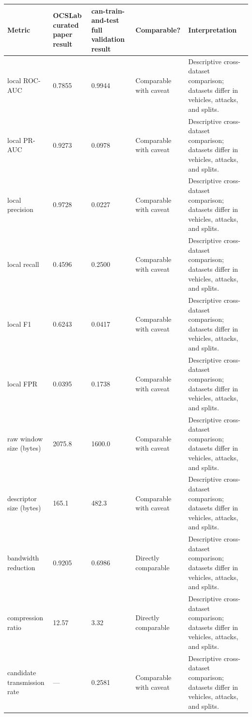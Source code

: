 \begin{tabular}{lllll}
\toprule
Metric & OCSLab curated paper result & can-train-and-test full validation result & Comparable? & Interpretation \\
\midrule
local ROC-AUC & 0.7855 & 0.9944 & Comparable with caveat & Descriptive cross-dataset comparison; datasets differ in vehicles, attacks, and splits. \\
local PR-AUC & 0.9273 & 0.0978 & Comparable with caveat & Descriptive cross-dataset comparison; datasets differ in vehicles, attacks, and splits. \\
local precision & 0.9728 & 0.0227 & Comparable with caveat & Descriptive cross-dataset comparison; datasets differ in vehicles, attacks, and splits. \\
local recall & 0.4596 & 0.2500 & Comparable with caveat & Descriptive cross-dataset comparison; datasets differ in vehicles, attacks, and splits. \\
local F1 & 0.6243 & 0.0417 & Comparable with caveat & Descriptive cross-dataset comparison; datasets differ in vehicles, attacks, and splits. \\
local FPR & 0.0395 & 0.1738 & Comparable with caveat & Descriptive cross-dataset comparison; datasets differ in vehicles, attacks, and splits. \\
raw window size (bytes) & 2075.8 & 1600.0 & Comparable with caveat & Descriptive cross-dataset comparison; datasets differ in vehicles, attacks, and splits. \\
descriptor size (bytes) & 165.1 & 482.3 & Comparable with caveat & Descriptive cross-dataset comparison; datasets differ in vehicles, attacks, and splits. \\
bandwidth reduction & 0.9205 & 0.6986 & Directly comparable & Descriptive cross-dataset comparison; datasets differ in vehicles, attacks, and splits. \\
compression ratio & 12.57 & 3.32 & Directly comparable & Descriptive cross-dataset comparison; datasets differ in vehicles, attacks, and splits. \\
candidate transmission rate & — & 0.2581 & Comparable with caveat & Descriptive cross-dataset comparison; datasets differ in vehicles, attacks, and splits. \\
\bottomrule
\end{tabular}
